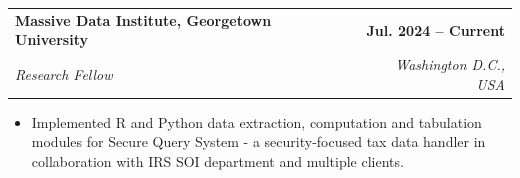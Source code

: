\documentclass[letterpaper,11pt]{article}
\makeatletter
\newcommand{\resumeItem}[1]{
  \item\small{
    {#1 \vspace{-2pt}}
  }
}
\newcommand{\resumeSubheading}[4]{
  \vspace{-2pt}\item
    \begin{tabular*}{1.0\textwidth}[t]{l@{\extracolsep{\fill}}r}
      \textbf{#1} & \textbf{\small #2} \\
      \textit{\small#3} & \textit{\small #4} \\
    \end{tabular*}\vspace{-7pt}
}
\newcommand{\resumeItemListStart}{\begin{itemize}}
\newcommand{\resumeItemListEnd}{\end{itemize}\vspace{-5pt}}
\makeatother
\begin{document}
    \resumeSubheading
    {Massive Data Institute, Georgetown University}{Jul. 2024 -- Current}
    {Research Fellow}{Washington D.C., USA}
      \resumeItemListStart
        \resumeItem{Implemented R and Python data extraction, computation and tabulation modules for Secure Query System - a security-focused tax data handler in collaboration with IRS SOI department and multiple clients. }
      \resumeItemListEnd
\end{document}
